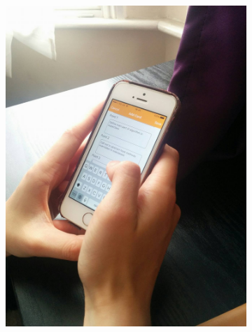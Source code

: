 \documentclass{article}
\begin{document}
\begin{figure}[ht]
\begin{subfigure}{}
			\includegraphics[scale=0.1]{prototype_swipe.jpg}
	\end{subfigure}
\end{figure}
\end{document}
